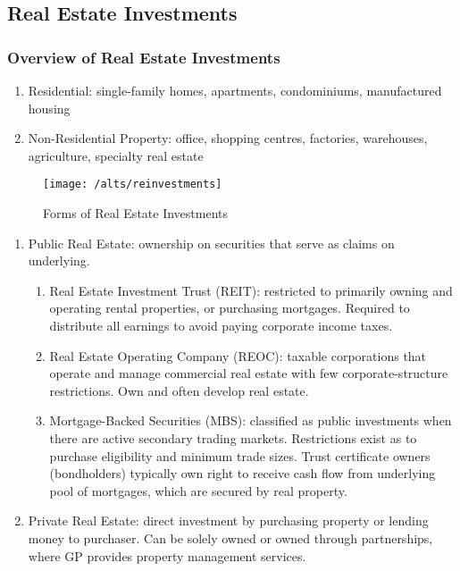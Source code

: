 \subsection{Real Estate Investments}

\subsubsection{Overview of Real Estate Investments}

\begin{remark} 
\begin{enumerate}[label=\roman*.]
\setlength{\itemsep}{0pt}
\item Residential: single-family homes, apartments, condominiums, manufactured housing
\item Non-Residential Property: office, shopping centres, factories, warehouses, agriculture, specialty real estate
\end{enumerate}
\end{remark}

\begin{figure}[H]
\centering
\texttt{[image: /alts/reinvestments]}
\caption{Forms of Real Estate Investments}
\end{figure}

\begin{remark} 
\begin{enumerate}[label=\roman*.]
\setlength{\itemsep}{0pt}
\item Public Real Estate: ownership on securities that serve as claims on underlying.
\begin{enumerate}[label=\arabic*.]
\setlength{\itemsep}{0pt}
\item Real Estate Investment Trust (REIT): restricted to primarily owning and operating rental properties, or purchasing mortgages. Required to distribute all earnings to avoid paying corporate income taxes.
\item Real Estate Operating Company (REOC): taxable corporations that operate and manage commercial real estate with few corporate-structure restrictions. Own and often develop real estate.
\item Mortgage-Backed Securities (MBS): classified as public investments when there are active secondary trading markets. Restrictions exist as to purchase eligibility and minimum trade sizes. Trust certificate owners (bondholders) typically own right to receive cash flow from underlying pool of mortgages, which are secured by real property.
\end{enumerate}
\item Private Real Estate: direct investment by purchasing property or lending money to purchaser. Can be solely owned or owned through partnerships, where GP provides property management services.
\end{enumerate}
\end{remark}

